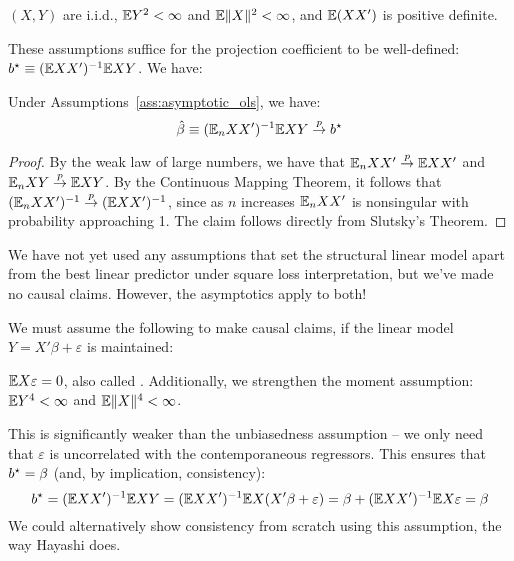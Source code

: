 \documentclass[10pt]{article}
\begin{document}
\begin{assumption}\label{ass:asymptotic_ols}
	$(X,Y)$ are i.i.d., $\mathbb{E} Y^2 < \infty$ and $\mathbb{E} \|X\|^2 < \infty$, and $\mathbb{E}(XX')$ is positive definite.
\end{assumption}

\begin{remark}
	These assumptions suffice for the projection coefficient to be well-defined: $b^\star \equiv (\mathbb{E} XX')^{-1} \mathbb{E} XY$. We have:
\end{remark}

\begin{theorem}
	Under Assumptions~\ref{ass:asymptotic_ols}, we have: \[\hat{\beta} \equiv (\mathbb{E}_n XX')^{-1}\mathbb{E} XY \overset{p}{\to} b^\star\]
\end{theorem}
\begin{proof}
	By the weak law of large numbers, we have that $\mathbb{E}_n XX' \overset{p}{\to} \mathbb{E} XX'$ and $\mathbb{E}_n XY \overset{p}{\to} \mathbb{E} XY$. By the Continuous Mapping Theorem, it follows that $(\mathbb{E}_n XX')^{-1} \overset{p}{\to} (\mathbb{E} XX')^{-1}$, since as $n$ increases $\mathbb{E}_n XX'$ is nonsingular with probability approaching 1. The claim follows directly from Slutsky's Theorem.
\end{proof}

We have not yet used any assumptions that set the structural linear model apart from the best linear predictor under square loss interpretation, but we've made no causal claims. However, the asymptotics apply to both! 

We must assume the following to make causal claims, if the linear model $Y = X'\beta + \varepsilon$ is maintained:
\begin{assumption}\label{ass:asymptotic_causal}
	$\mathbb{E} X\varepsilon = 0$, also called . Additionally, we strengthen the moment assumption: $\mathbb{E} Y^4 < \infty$ and $\mathbb{E} \|X\|^4 < \infty$.
\end{assumption}
\begin{remark}
	This is significantly weaker than the unbiasedness assumption -- we only need that $\varepsilon$ is uncorrelated with the contemporaneous regressors. This ensures that $b^\star = \beta$ (and, by implication, consistency): \[b^\star = (\mathbb{E} XX')^{-1}\mathbb{E} XY = (\mathbb{E} XX')^{-1}\mathbb{E} X(X'\beta + \varepsilon) = \beta + (\mathbb{E} XX')^{-1}\mathbb{E} X\varepsilon = \beta\]
	We could alternatively show consistency from scratch using this assumption, the way Hayashi does.
\end{remark}
\end{document}
